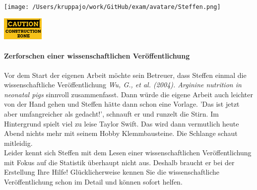 \documentclass[a4paper, 9pt]{scrartcl}\usepackage[]{graphicx}\usepackage[]{xcolor}
\begin{document}
 
\ifcollection
\begin{flushright}
\tiny\vspace{-3Ex}
\textbf{\examinhaltstart}
\exammodulebiostat
\vspace{-4Ex}
\end{flushright}
\begin{minipage}[t]{0.5\textwidth}
\texttt{[image: /Users/kruppajo/work/GitHub/exam/avatare/Steffen.png]}
\end{minipage}
\begin{minipage}[t]{0.5\textwidth}
\hfill
\href{https://youtu.be/C9skfFRTHhI}{\includegraphics[width = 2cm]{img/caution}}
\end{minipage}
\fi



\ifcollection
\paragraph{Zerforschen einer wissenschaftlichen Veröffentlichung}
\fi

Vor dem Start der eigenen Arbeit möchte sein Betreuer, dass Steffen einmal die wissenschaftliche Veröffentlichung \textit{Wu, G., et al. (2004). Arginine nutrition in neonatal pigs} sinnvoll zusammenfasst. Dann würde die eigene Arbeit auch leichter von der Hand gehen und Steffen hätte dann schon eine Vorlage. 'Das ist jetzt aber umfangreicher als gedacht!', schnauft er und runzelt die Stirn. Im Hintergrund spielt viel zu leise Taylor Swift. Das wird dann vermutlich heute Abend nichts mehr mit seinem Hobby Klemmbausteine. Die Schlange schaut mitleidig.\\

Leider kennt sich Steffen mit dem Lesen einer wissenschaftlichen Veröffentlichung mit Fokus auf die Statistik überhaupt nicht aus. Deshalb braucht er bei der Erstellung Ihre Hilfe! Glücklicherweise kennen Sie die wissenschaftliche Veröffentlichung schon im Detail und können sofort helfen.
\end{document}
